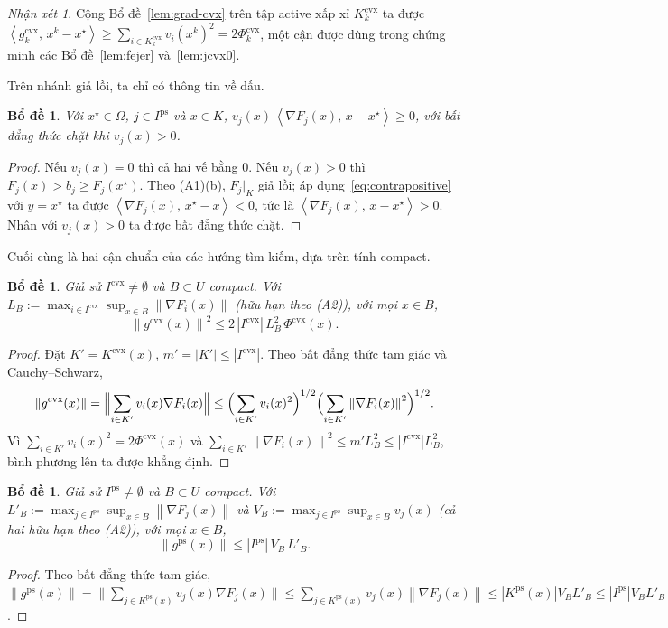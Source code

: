 \documentclass[]{interact}
\theoremstyle{plain}
\newtheorem{lemma}[theorem]{Bổ đề}
\theoremstyle{definition}
\theoremstyle{remark}
\newtheorem{remark}{Nhận xét}
\newcommand{\norm}[1]{\left\lVert #1 \right\rVert}
\newcommand{\abs}[1]{\left\lvert #1 \right\rvert}
\newcommand{\inner}[2]{\left\langle #1,\, #2 \right\rangle}
\newcommand{\cvx}{\mathrm{cvx}}
\newcommand{\ps}{\mathrm{ps}}
\begin{document}
\begin{remark}\label{rem:grad-cvx-sum}
Cộng Bổ đề~\ref{lem:grad-cvx} trên tập active xấp xỉ $K^{\cvx}_k$ ta được
$\inner{g^{\cvx}_k}{x^k-x^\star}\ge\sum_{i\in K^{\cvx}_k}v_i(x^k)^2=2\Phi^{\cvx}_k$, một cận
được dùng trong chứng minh các Bổ đề~\ref{lem:fejer} và~\ref{lem:jcvx0}.
\end{remark}

Trên nhánh giả lồi, ta chỉ có thông tin về dấu.

\begin{lemma}\label{lem:sign-ps}
Với $x^\star\in\Omega$, $j\in I^{\ps}$ và $x\in K$,
$v_j(x)\,\inner{\nabla F_j(x)}{x-x^\star}\ge 0$, với bất đẳng thức chặt khi $v_j(x)>0$.
\end{lemma}
\begin{proof}
Nếu $v_j(x)=0$ thì cả hai vế bằng $0$. Nếu $v_j(x)>0$ thì $F_j(x)>b_j\ge F_j(x^\star)$. Theo
(A1)(b), $F_j|_K$ giả lồi; áp dụng~\eqref{eq:contrapositive}
với $y=x^\star$ ta được $\inner{\nabla F_j(x)}{x^\star-x}<0$, tức là
$\inner{\nabla F_j(x)}{x-x^\star}>0$. Nhân với $v_j(x)>0$ ta được bất đẳng thức
chặt.
\end{proof}

Cuối cùng là hai cận chuẩn của các hướng tìm kiếm, dựa trên tính compact.

\begin{lemma}\label{lem:bound-cvx}
Giả sử $I^{\cvx}\ne\emptyset$ và $B\subset U$ compact. Với
$L_B:=\max_{i\in I^{\cvx}}\sup_{x\in B}\norm{\nabla F_i(x)}$ (hữu hạn theo (A2)), với mọi
$x\in B$,
\[
\norm{g^{\cvx}(x)}^2\le 2\,\abs{I^{\cvx}}\,L_B^2\,\Phi^{\cvx}(x).
\]
\end{lemma}
\begin{proof}
Đặt $K'=K^{\cvx}(x)$, $m'=\abs{K'}\le\abs{I^{\cvx}}$. Theo bất đẳng thức tam giác và
Cauchy--Schwarz,
\[
\norm{g^{\cvx}(x)}=\Bigl\|\sum_{i\in K'}v_i(x)\nabla F_i(x)\Bigr\|
\le\Bigl(\sum_{i\in K'}v_i(x)^2\Bigr)^{1/2}\Bigl(\sum_{i\in K'}\norm{\nabla F_i(x)}^2\Bigr)^{1/2}.
\]
Vì $\sum_{i\in K'}v_i(x)^2=2\Phi^{\cvx}(x)$ và
$\sum_{i\in K'}\norm{\nabla F_i(x)}^2\le m'L_B^2\le\abs{I^{\cvx}}L_B^2$, bình phương lên ta được
khẳng định.
\end{proof}

\begin{lemma}\label{lem:bound-ps}
Giả sử $I^{\ps}\ne\emptyset$ và $B\subset U$ compact. Với
$L'_B:=\max_{j\in I^{\ps}}\sup_{x\in B}\norm{\nabla F_j(x)}$ và
$V_B:=\max_{j\in I^{\ps}}\sup_{x\in B}v_j(x)$ (cả hai hữu hạn theo (A2)), với mọi $x\in B$,
\[
\norm{g^{\ps}(x)}\le\abs{I^{\ps}}\,V_B\,L'_B .
\]
\end{lemma}
\begin{proof}
Theo bất đẳng thức tam giác,
$\norm{g^{\ps}(x)}=\bigl\|\sum_{j\in K^{\ps}(x)}v_j(x)\nabla F_j(x)\bigr\|
\le\sum_{j\in K^{\ps}(x)}v_j(x)\norm{\nabla F_j(x)}\le\abs{K^{\ps}(x)}V_BL'_B
\le\abs{I^{\ps}}V_BL'_B$.
\end{proof}
\end{document}
